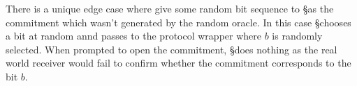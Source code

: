 There is a unique edge case where \Z give some random bit sequence to \S as the commitment which wasn't generated by the random oracle. 
In this case \S chooses a bit at random annd passes  to the protocol wrapper where $b$ is randomly selected.
When prompted to open the commitment, \S does nothing as the real world receiver would fail to confirm whether the commitment corresponds to the bit $b$.

%
%
%
%
%
%
%
%
%
